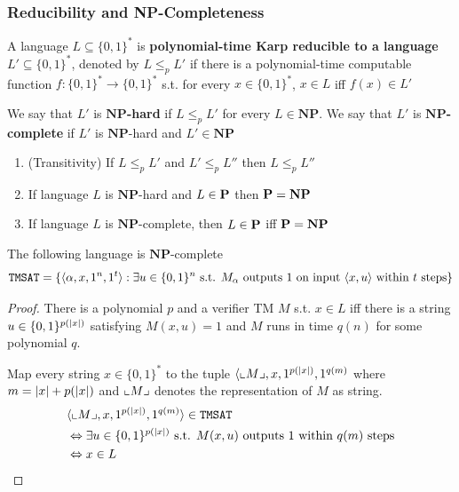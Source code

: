 \documentclass[11pt]{article}
\def \NP {\textbf{NP}}
\def \NP {\textbf{NP}}
\def \TMSAT {\texttt{TMSAT}}
\begin{document}
\subsubsection{Reducibility and NP-Completeness}
\label{sec:orge73508a}
\begin{definition}[]
A language \(L\subseteq\{0,1\}^*\) is \textbf{polynomial-time Karp reducible to a
language} \(L'\subseteq\{0,1\}^*\), denoted by \(L\le_p L'\) if there is a polynomial-time
computable function \(f:\{0,1\}^*\to\{0,1\}^*\) s.t. for every \(x\in\{0,1\}^*\),
\(x\in L\) iff \(f(x)\in L'\)

We say that \(L'\) is \textbf{\(\NP\)-hard} if \(L\le_pL'\) for every \(L\in\NP\). We say that \(L'\)
is \textbf{\(\NP\)-complete} if \(L'\) is \(\NP\)-hard and \(L'\in\NP\)
\end{definition}

\begin{theorem}[]
\begin{enumerate}
\item (Transitivity) If \(L\le_pL'\) and \(L'\le_pL''\) then \(L\le_pL''\)
\item If language \(L\) is \(\NP\)-hard and \(L\in\operatorname{\textbf{P}}\) then \(\bP=\NP\)
\item If language \(L\) is \(\NP\)-complete, then \(L\in\operatorname{\textbf{P}}\) iff \(\bP=\NP\)
\end{enumerate}
\end{theorem}

\begin{theorem}[]
The following language is \(\NP\)-complete
    \begin{equation*}
\TMSAT=\{\la\alpha,x,1^n,1^t\ra:\exists u\in\{0,1\}^n\text{ s.t. }M_\alpha\text{ outputs }1
\text{ on input }\la x,u\ra\text{ within }t\text{ steps}\}
    \end{equation*}
\end{theorem}

\begin{proof}
There is a polynomial \(p\) and a verifier TM \(M\) s.t. \(x\in L\) iff there is a
string \(u\in\{0,1\}^{p(\abs{x})}\) satisfying \(M(x,u)=1\) and \(M\) runs in time \(q(n)\) for
some polynomial \(q\).

Map every string \(x\in\{0,1\}^*\) to the tuple \(\la\lcorner{M},x,1^{p(\abs{x})},1^{q(m)}\)
where \(m=\abs{x}+p(\abs{x})\) and \(\llcorner M \lrcorner\) denotes the representation of \(M\) as
string.
    \begin{align*}
&\la\lcorner{M},x,1^{p(\abs{x})},1^{q(m)}\ra\in\TMSAT\\
&\Leftrightarrow\exists u\in\{0,1\}^{p(\abs{x})}\text{ s.t. }M(x,u)\text{ outputs 1 within }q(m)\text{ steps}\\
&\Leftrightarrow x\in L
    \end{align*}
\end{proof}
\end{document}
